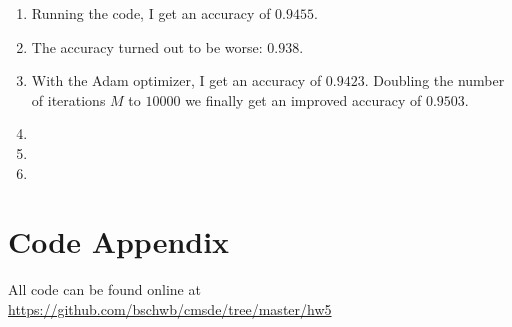 \documentclass[a4paper,11pt]{scrartcl}
\begin{document}
\begin{enumerate}

\item
  Running the code, I get an accuracy of $0.9455$.

\item
  The accuracy turned out to be worse: $0.938$.

\item
  With the Adam optimizer, I get an accuracy of $0.9423$.
  Doubling the number of iterations $M$ to $10000$ we finally get an improved
  accuracy of $0.9503$.

\item

\item

\item


\end{enumerate}
 
\section*{Code Appendix}

All code can be found online at
\url{https://github.com/bschwb/cmsde/tree/master/hw5}

% 

% 
\end{document}
